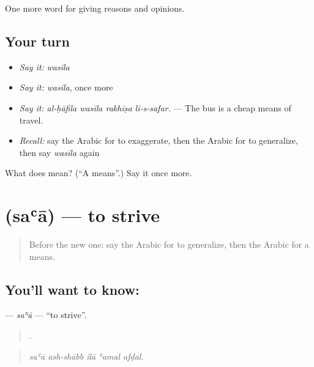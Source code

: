 \begin{grammarlens}[title={What you've built}]
One more word for giving reasons and opinions.
\end{grammarlens}

\subsection*{Your turn}
\begin{itemize}
\raggedright
  \item \emph{Say it:} \emph{wasīla}
  \item \emph{Say it:} \emph{wasīla}, once more
  \item \emph{Say it:} \emph{al-ḥāfila wasīla rakhīṣa li-s-safar.} — The bus is a cheap means of travel.
  \item \emph{Recall:} say the Arabic for to exaggerate, then the Arabic for to generalize, then say \emph{wasīla} again
\end{itemize}

\begin{tcolorbox}[breakable,colback=teal!4,colframe=teal!35!black,title={Before you move on}]
What does  mean? (\textquotedblleft{}A means\textquotedblright{}.) Say it once more.
\end{tcolorbox}
\section[\texorpdfstring{\ar{سعى} (saʿā)}{سعى (saʿā)}]{ (saʿā) — to strive}

\label{lesson:AR-C371-saa}



\begin{quote}
Before the new one: say the Arabic for to generalize, then the Arabic for a means.
\end{quote}

\subsection*{You'll want to know: }
\textbf{} — \emph{saʿā} — \textquotedblleft{}to strive\textquotedblright{}.

\begin{quote}
    .
\end{quote}

\begin{quote}
\emph{saʿā ash-shābb ilā ʿamal afḍal.}
\end{quote}

